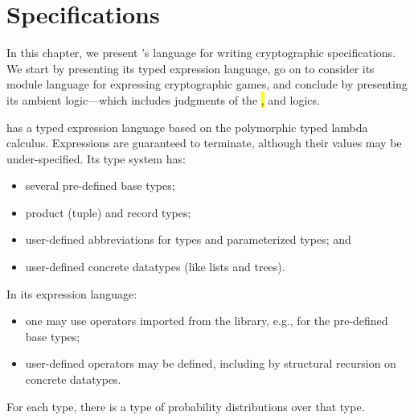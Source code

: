 \chapter{Specifications}
\label{Specifications}

In this chapter, we present \EasyCrypt's language for writing
cryptographic specifications.  We start by presenting its typed
expression language, go on to consider its module language for
expressing cryptographic games, and conclude by presenting its
ambient logic---which includes judgments of the \hl, \phl and \prhl
logics.

\EasyCrypt has a typed expression language based on the polymorphic
typed lambda calculus. Expressions are guaranteed to terminate,
although their values may be under-specified.  Its type system has:
\begin{itemize}
\item several pre-defined base types;

\item product (tuple) and record types;

\item user-defined abbreviations for types and parameterized types; and

\item user-defined concrete datatypes (like lists and trees).
\end{itemize}
In its expression language:
\begin{itemize}
\item one may use operators imported from the \EasyCrypt library, e.g.,
  for the pre-defined base types;

\item user-defined operators may be defined, including by
  structural recursion on concrete datatypes.
\end{itemize}
For each type, there is a type of probability distributions over that
type.

